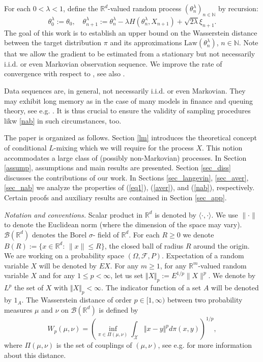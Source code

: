 \documentclass[a4paper]{article}
\begin{document}
For each $0<\lambda<1$, define the $\mathbb{R}^d$-valued
random process $(\theta^{\lambda}_n)_{n\in\mathbb{N}}$ by recursion:
\begin{equation}\label{nab}
\theta^{\lambda}_0:=\theta_0,\quad \theta^{\lambda}_{n+1}:=\theta^{\lambda}_n-\lambda H(\theta^{\lambda}_n,X_{n+1})+\sqrt{2\lambda}\xi_{n+1}.
\end{equation}
The goal of this work is to establish an upper
bound on the Wasserstein distance between the target distribution $\pi$ and its approximations $\mathrm{Law}(\theta^{\lambda}_n)$, $n\in\mathbb{N}$. Note that we allow the gradient to be estimated from a stationary but not necessarily i.i.d. or even Markovian observation sequence. We improve the rate of convergence with respect to \cite{raginsky}, see also \cite{xu}.

Data sequences are, in general, not necessarily i.i.d. or even Markovian.
They may exhibit long memory as in the case of many models
in finance and queuing theory, see e.g. \cite{taqqu,b}. It is thus crucial
to ensure the validity of sampling procedures likw \eqref{nab} in
such circumstances, too.

The paper is organized as follows. Section \ref{lm} introduces the
theoretical concept of conditional $L$-mixing which we will require for the process
$X$. This notion accommodates a large class of (possibly non-Markovian) processes.
In Section \ref{assump}, assumptions and main results are presented. Section \ref{sec_diss} discusses the contributions of our work. In Sections \ref{sec_langevin}, \ref{sec_aver}, \ref{sec_nab} we analyze the properties of (\ref{eq1}), (\ref{aver}), and (\ref{nab}), respectively. Certain proofs and auxiliary results are contained in Section \ref{sec_app}.


\emph{Notation and conventions.} Scalar product in $\mathbb{R}^d$
is denoted by $\langle \cdot,\cdot\rangle$. We use $\| \cdot \|$ to denote
the Euclidean norm (where the dimension of the space may vary). $\mathcal{B}(\mathbb{R}^d)$ denotes the Borel $\sigma$- field of $\mathbb{R}^d$. For each $R\geq 0$
we denote $B(R):=\{x\in\mathbb{R}^d:\, \|x\|\leq R\}$, the closed
ball of radius $R$ around the origin. We are working on a probability space $(\Omega,\mathcal{F},P)$.  Expectation of
a random variable $X$ will be denoted by $EX$.
For any $m\geq 1$, for any $\mathbb{R}^m$-valued random variable $X$ and for any $1\leq p<\infty$, let us set
$\Vert X\Vert_p:=E^{1/p}\|X\|^p$. We denote by $L^p$ the set of $X$ with $\Vert X\Vert_p<\infty$.
The indicator function of a set $A$ will be denoted by $1_A$.  The Wasserstein distance of order $p \in [1,\infty)$ between two probability measures $\mu$ and $\nu$ on $\mathcal{B}(\mathbb{R}^d)$ is defined by
\begin{equation}\label{w_dist}
W_p(\mu,\nu) = \left( \inf_{\pi \in \Pi(\mu,\nu)} \int_{\mathcal{X}} \Vert x-y\Vert^p
d\pi(x,y)  \right)^{1/p},
\end{equation}
where $\Pi(\mu,\nu)$ is the set of couplings of $(\mu, \nu)$, see e.g. \cite{villani}
for more information about this distance.
\end{document}
